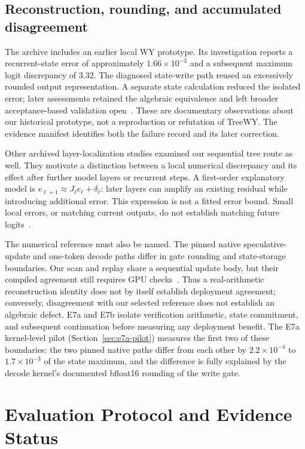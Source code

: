 \documentclass[conference]{IEEEtran}
\begin{document}
\subsection{Reconstruction, rounding, and accumulated disagreement}
\label{sec:reconstruction-numerics}
The archive includes an earlier local WY prototype. Its investigation reports a recurrent-state error of approximately $1.66\times10^{-3}$ and a subsequent maximum logit discrepancy of 3.32. The diagnosed state-write path reused an excessively rounded output representation. A separate state calculation reduced the isolated error; later assessments retained the algebraic equivalence and left broader acceptance-based validation open~\cite{lumo2026archive}. These are documentary observations about our historical prototype, not a reproduction or refutation of TreeWY. The evidence manifest identifies both the failure record and its later correction.

Other archived layer-localization studies examined our sequential tree route as well. They motivate a distinction between a local numerical discrepancy and its effect after further model layers or recurrent steps. A first-order explanatory model is $e_{\ell+1}\approx J_\ell e_\ell+\delta_\ell$: later layers can amplify an existing residual while introducing additional error. This expression is not a fitted error bound. Small local errors, or matching current outputs, do not establish matching future logits~\cite{lumo2026archive}.

The numerical reference must also be named. The pinned native speculative-update and one-token decode paths differ in gate rounding and state-storage boundaries. Our scan and replay share a sequential update body, but their compiled agreement still requires GPU checks~\cite{lumo2026archive}. Thus a real-arithmetic reconstruction identity does not by itself establish deployment agreement; conversely, disagreement with our selected reference does not establish an algebraic defect. E7a and E7b isolate verification arithmetic, state commitment, and subsequent continuation before measuring any deployment benefit. The E7a kernel-level pilot (Section~\ref{sec:e7a-pilot}) measures the first two of these boundaries: the two pinned native paths differ from each other by $2.2\times10^{-4}$ to $1.7\times10^{-3}$ of the state maximum, and the difference is fully explained by the decode kernel's documented bfloat16 rounding of the write gate.

\section{Evaluation Protocol and Evidence Status}
\label{sec:protocol}
\end{document}
